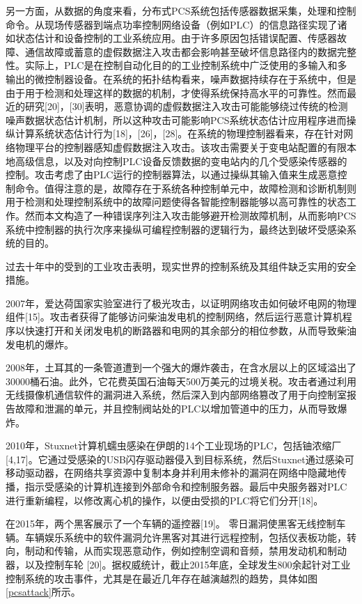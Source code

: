 另一方面，从数据的角度来看，分布式PCS系统包括传感器数据采集，处理和控制命令。从现场传感器到端点功率控制网络设备（例如PLC）的信息路径实现了诸如状态估计和设备控制的工业系统应用。由于许多原因包括错误配置、传感器故障、通信故障或蓄意的虚假数据注入攻击都会影响甚至破坏信息路径内的数据完整性。实际上，PLC是在控制自动化目的的工业控制系统中广泛使用的多输入和多输出的微控制器设备。在系统的拓扑结构看来，噪声数据持续存在于系统中，但是由于用于检测和处理这样的数据的机制，才使得系统保持高水平的可靠性。然而最近的研究[20]，[30]表明，恶意协调的虚假数据注入攻击可能能够绕过传统的检测噪声数据状态估计机制，所以这种攻击可能影响PCS系统状态估计应用程序进而操纵计算系统状态估计行为[18]，[26]，[28]。在系统的物理控制器看来，存在针对网络物理平台的控制器感知虚假数据注入攻击。该攻击需要关于变电站配置的有限本地高级信息，以及对向控制PLC设备反馈数据的变电站内的几个受感染传感器的控制。攻击考虑了由PLC运行的控制器算法，以通过操纵其输入值来生成恶意控制命令。值得注意的是，故障存在于系统各种控制单元中，故障检测和诊断机制则用于检测和处理控制系统中的故障问题使得各智能控制器能够以高可靠性的状态工作。然而本文构造了一种错误序列注入攻击能够避开检测故障机制，从而影响PCS系统中控制器的执行次序来操纵可编程控制器的逻辑行为，最终达到破坏受感染系统的目的。

过去十年中的受到的工业攻击表明，现实世界的控制系统及其组件缺乏实用的安全措施。

2007年，爱达荷国家实验室进行了极光攻击，以证明网络攻击如何破坏电网的物理组件[15]。攻击者获得了能够访问柴油发电机的控制网络，然后运行恶意计算机程序以快速打开和关闭发电机的断路器和电网的其余部分的相位参数，从而导致柴油发电机的爆炸。 

2008年，土耳其的一条管道遭到一个强大的爆炸袭击，在含水层以上的区域溢出了30000桶石油。此外，它花费英国石油每天500万美元的过境关税。攻击者通过利用无线摄像机通信软件的漏洞进入系统，然后深入到内部网络篡改了用于向控制室报告故障和泄漏的单元，并且控制阀站处的PLC以增加管道中的压力，从而导致爆炸。

2010年，Stuxnet计算机蠕虫感染在伊朗的14个工业现场的PLC，包括铀浓缩厂[4,17]。它通过受感染的USB闪存驱动器侵入到目标系统，然后Stuxnet通过感染可移动驱动器，在网络共享资源中复制本身并利用未修补的漏洞在网络中隐藏地传播，指示受感染的计算机连接到外部命令和控制服务器。最后中央服务器对PLC进行重新编程，以修改离心机的操作，以便由受损的PLC将它们分开[18]。 

在2015年，两个黑客展示了一个车辆的遥控器[19]。 零日漏洞使黑客无线控制车辆。车辆娱乐系统中的软件漏洞允许黑客对其进行远程控制，包括仪表板功能，转向，制动和传输，从而实现恶意动作，例如控制空调和音频，禁用发动机和制动器，以及控制车轮 [20]。据权威统计，截止2015年底，全球发生800余起针对工业控制系统的攻击事件，尤其是在最近几年存在越演越烈的趋势，具体如图\ref{pcsattack}所示。

